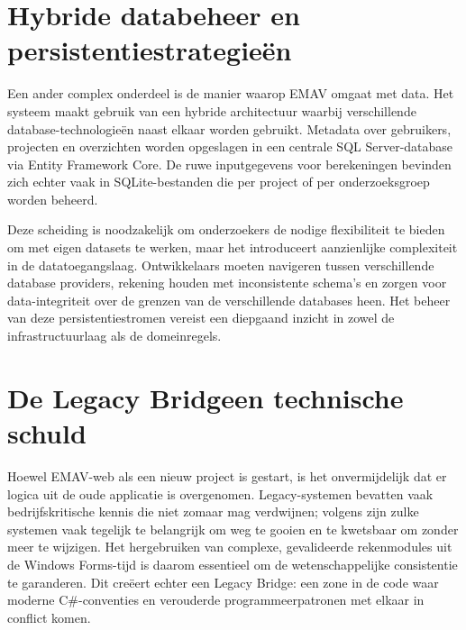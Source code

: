 \section{Hybride databeheer en persistentiestrategieën}
{\sloppy Een ander complex onderdeel is de manier waarop EMAV omgaat met data. Het systeem maakt gebruik van een hybride architectuur waarbij verschillende database-technologieën naast elkaar worden gebruikt. Metadata over gebruikers, projecten en overzichten worden opgeslagen in een centrale SQL Server-database via Entity Framework Core. De ruwe inputgegevens voor berekeningen bevinden zich echter vaak in SQLite-bestanden die per project of per onderzoeksgroep worden beheerd.\par}

Deze scheiding is noodzakelijk om onderzoekers de nodige flexibiliteit te bieden om met eigen datasets te werken, maar het introduceert aanzienlijke complexiteit in de datatoegangslaag. Ontwikkelaars moeten navigeren tussen verschillende database providers, rekening houden met inconsistente schema's en zorgen voor data-integriteit over de grenzen van de verschillende databases heen. Het beheer van deze persistentiestromen vereist een diepgaand inzicht in zowel de infrastructuurlaag als de domeinregels.

\section{De \textquotedbl Legacy Bridge\textquotedbl \@ en technische schuld}
Hoewel EMAV-web als een nieuw project is gestart, is het onvermijdelijk dat er logica uit de oude applicatie is overgenomen. Legacy-systemen bevatten vaak bedrijfskritische kennis die niet zomaar mag verdwijnen; volgens \textcite{comellaDorda2000survey} zijn zulke systemen vaak tegelijk te belangrijk om weg te gooien en te kwetsbaar om zonder meer te wijzigen. Het hergebruiken van complexe, gevalideerde rekenmodules uit de Windows Forms-tijd is daarom essentieel om de wetenschappelijke consistentie te garanderen. Dit creëert echter een Legacy Bridge: een zone in de code waar moderne C\#-conventies en verouderde programmeerpatronen met elkaar in conflict komen.

